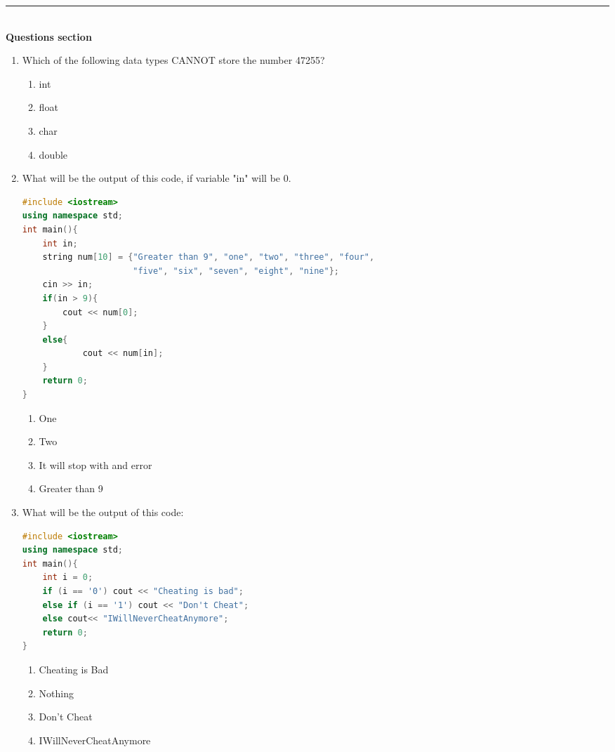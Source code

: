 \documentclass[10pt]{article}
\begin{document}
\medskip\hrule
\textbf{
\\
{Questions section}\\
}
\begin{enumerate}


\item Which of the following data types CANNOT store the number 47255?
\begin{multicols}{4}
\begin{enumerate}
    \item int
    \item float
    \item char 
    \item double
\end{enumerate}
\end{multicols}



\item What will be the output of this code, if variable "in" will be 0.
\begin{lstlisting}[language=C++]
#include <iostream>
using namespace std;
int main(){
    int in;
    string num[10] = {"Greater than 9", "one", "two", "three", "four",
                      "five", "six", "seven", "eight", "nine"};
    cin >> in;
    if(in > 9){
        cout << num[0];
    }
    else{
            cout << num[in];
    }
    return 0;
}
\end{lstlisting}
\begin{multicols}{4}
\begin{enumerate}
    \item One
    \item Two
    \item It will stop with and error 
    \item Greater than 9 
\end{enumerate}
\end{multicols}





\item What will be the output of this code:
\begin{lstlisting}[language=C++]
#include <iostream>
using namespace std;
int main(){
    int i = 0;
    if (i == '0') cout << "Cheating is bad";
    else if (i == '1') cout << "Don't Cheat";
    else cout<< "IWillNeverCheatAnymore";
    return 0;
}
\end{lstlisting}
\begin{multicols}{4}
\begin{enumerate}
    \item Cheating is Bad
    \item Nothing
    \item Don't Cheat 
    \item IWillNeverCheatAnymore 
\end{enumerate}
\end{multicols}





\end{enumerate}
\end{document}
